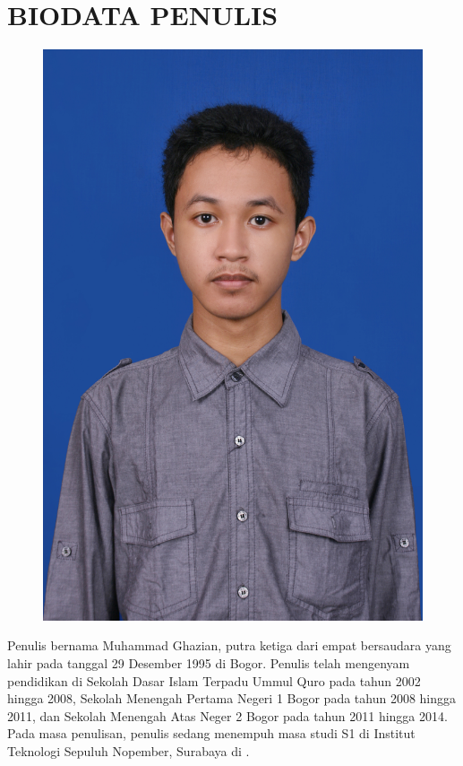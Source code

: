 \chapter{BIODATA PENULIS}

\begin{figure}
	\includegraphics[height=0.3\textheight]{penutup/img/IMG_3563}
\end{figure}

Penulis bernama Muhammad Ghazian, putra ketiga dari empat bersaudara yang lahir pada tanggal 29 Desember 1995 di Bogor. Penulis telah mengenyam pendidikan di Sekolah Dasar Islam Terpadu Ummul Quro pada tahun 2002 hingga 2008, Sekolah Menengah Pertama Negeri 1 Bogor pada tahun 2008 hingga 2011, dan Sekolah Menengah Atas Neger 2 Bogor pada tahun 2011 hingga 2014. Pada masa penulisan, penulis sedang menempuh masa studi S1 di Institut Teknologi Sepuluh Nopember, Surabaya di \jurusanlama.

